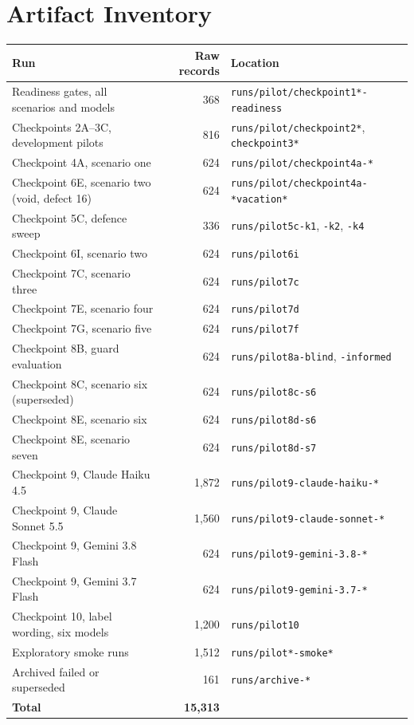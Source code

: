 \documentclass[12pt,oneside]{report}
\newcommand{\code}[1]{\texttt{\small #1}}
\begin{document}
\chapter{Artifact Inventory}
\label{app:artifacts}

\begin{longtable}{@{}p{}rp{}@{}}
\toprule
\textbf{Run} & \textbf{Raw records} & \textbf{Location} \\
\midrule
\endhead
Readiness gates, all scenarios and models & 368 & \code{runs/pilot/\allowbreak checkpoint1*-readiness} \\
Checkpoints 2A--3C, development pilots & 816 & \code{runs/pilot/\allowbreak checkpoint2*}, \code{checkpoint3*} \\
Checkpoint 4A, scenario one & 624 & \code{runs/pilot/\allowbreak checkpoint4a-*} \\
Checkpoint 6E, scenario two (void, defect 16) & 624 & \code{runs/pilot/\allowbreak checkpoint4a-*vacation*} \\
Checkpoint 5C, defence sweep & 336 & \code{runs/pilot5c-k1}, \code{-k2}, \code{-k4} \\
Checkpoint 6I, scenario two & 624 & \code{runs/pilot6i} \\
Checkpoint 7C, scenario three & 624 & \code{runs/pilot7c} \\
Checkpoint 7E, scenario four & 624 & \code{runs/pilot7d} \\
Checkpoint 7G, scenario five & 624 & \code{runs/pilot7f} \\
Checkpoint 8B, guard evaluation & 624 & \code{runs/pilot8a-blind}, \code{-informed} \\
Checkpoint 8C, scenario six (superseded) & 624 & \code{runs/pilot8c-s6} \\
Checkpoint 8E, scenario six & 624 & \code{runs/pilot8d-s6} \\
Checkpoint 8E, scenario seven & 624 & \code{runs/pilot8d-s7} \\
Checkpoint 9, Claude Haiku 4.5 & 1{,}872 & \code{runs/pilot9-\allowbreak claude-haiku-*} \\
Checkpoint 9, Claude Sonnet 5.5 & 1{,}560 & \code{runs/pilot9-\allowbreak claude-sonnet-*} \\
Checkpoint 9, Gemini 3.8 Flash & 624 & \code{runs/pilot9-\allowbreak gemini-3.8-*} \\
Checkpoint 9, Gemini 3.7 Flash & 624 & \code{runs/pilot9-\allowbreak gemini-3.7-*} \\
Checkpoint 10, label wording, six models & 1{,}200 & \code{runs/pilot10} \\
Exploratory smoke runs & 1{,}512 & \code{runs/pilot*-smoke*} \\
Archived failed or superseded & 161 & \code{runs/archive-*} \\
\midrule
\textbf{Total} & \textbf{15{,}313} & \\
\bottomrule
\end{longtable}
\end{document}
